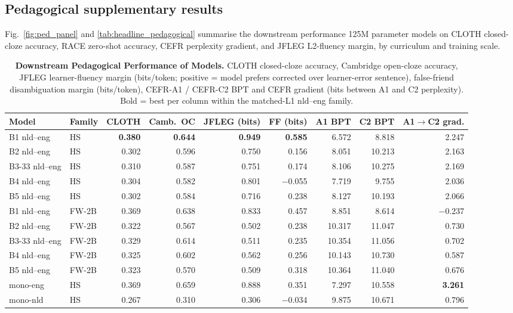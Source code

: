 \newpage 
\clearpage 
\subsection{Pedagogical supplementary results}\label{appcomp:peda}

Fig.~\ref{fig:ped_panel} and \autoref{tab:headline_pedagogical} summarise the downstream performance \beetle{} 125M parameter models on CLOTH closed-cloze accuracy, RACE zero-shot accuracy, CEFR perplexity gradient, and JFLEG L2-fluency margin, by curriculum and training scale. 


\begin{table}[!ht]
  \centering
  \scriptsize
  \setlength{\tabcolsep}{4pt}
  \caption{\textbf{Downstream Pedagogical Performance of \beetle{} Models.} CLOTH closed-cloze accuracy, Cambridge open-cloze accuracy, JFLEG learner-fluency margin (bits/token; positive = model prefers corrected over learner-error sentence), false-friend disambiguation margin (bits/token), CEFR-A1 / CEFR-C2 BPT and CEFR gradient (bits between A1 and C2 perplexity). Bold = best per column within the matched-L1 nld--eng family.}
  \label{tab:headline_pedagogical}
  \begin{tabular}{llrrrrrrr}
    \toprule
    Model & Family & CLOTH & Camb.~OC & JFLEG (bits) & FF (bits) & A1 BPT & C2 BPT & A1$\to$C2 grad. \\
    \midrule
    B1 nld--eng     & HS & \textbf{0.380} & \textbf{0.644} & \textbf{0.949} & \textbf{0.585} & 6.572 & 8.818 & 2.247 \\
    B2 nld--eng     & HS & 0.302 & 0.596 & 0.750 & 0.156 & 8.051 & 10.213 & 2.163 \\
    B3-33 nld--eng  & HS & 0.310 & 0.587 & 0.751 & 0.174 & 8.106 & 10.275 & 2.169 \\
    B4 nld--eng     & HS & 0.304 & 0.582 & 0.801 & $-$0.055 & 7.719 & 9.755 & 2.036 \\
    B5 nld--eng     & HS & 0.302 & 0.584 & 0.716 & 0.238 & 8.127 & 10.193 & 2.066 \\
    \midrule
    B1 nld--eng     & FW-2B & 0.369 & 0.638 & 0.833 & 0.457 & 8.851 & 8.614 & $-$0.237 \\
    B2 nld--eng     & FW-2B & 0.322 & 0.567 & 0.502 & 0.238 & 10.317 & 11.047 & 0.730 \\
    B3-33 nld--eng  & FW-2B & 0.329 & 0.614 & 0.511 & 0.235 & 10.354 & 11.056 & 0.702 \\
    B4 nld--eng     & FW-2B & 0.325 & 0.602 & 0.562 & 0.256 & 10.143 & 10.730 & 0.587 \\
    B5 nld--eng     & FW-2B & 0.323 & 0.570 & 0.509 & 0.318 & 10.364 & 11.040 & 0.676 \\
    \midrule
    mono-eng        & HS & 0.369 & 0.659 & 0.888 & 0.351 & 7.297 & 10.558 & \textbf{3.261} \\
    mono-nld        & HS & 0.267 & 0.310 & 0.306 & $-$0.034 & 9.875 & 10.671 & 0.796 \\
    \bottomrule
  \end{tabular}
\end{table}


